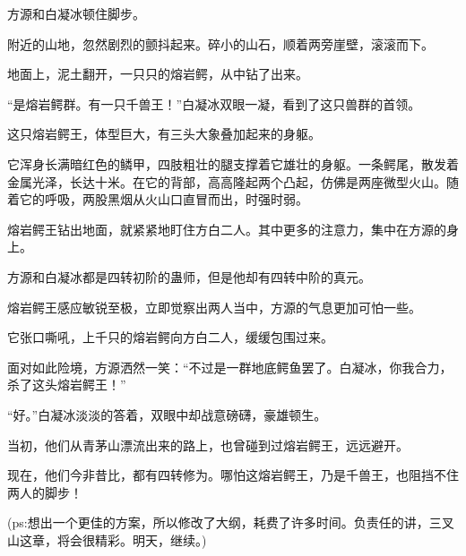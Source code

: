 \begin{this_body}
方源和白凝冰顿住脚步。

附近的山地，忽然剧烈的颤抖起来。碎小的山石，顺着两旁崖壁，滚滚而下。

地面上，泥土翻开，一只只的熔岩鳄，从中钻了出来。

“是熔岩鳄群。有一只千兽王！”白凝冰双眼一凝，看到了这只兽群的首领。

这只熔岩鳄王，体型巨大，有三头大象叠加起来的身躯。

它浑身长满暗红色的鳞甲，四肢粗壮的腿支撑着它雄壮的身躯。一条鳄尾，散发着金属光泽，长达十米。在它的背部，高高隆起两个凸起，仿佛是两座微型火山。随着它的呼吸，两股黑烟从火山口直冒而出，时强时弱。

熔岩鳄王钻出地面，就紧紧地盯住方白二人。其中更多的注意力，集中在方源的身上。

方源和白凝冰都是四转初阶的蛊师，但是他却有四转中阶的真元。

熔岩鳄王感应敏锐至极，立即觉察出两人当中，方源的气息更加可怕一些。

它张口嘶吼，上千只的熔岩鳄向方白二人，缓缓包围过来。

面对如此险境，方源洒然一笑：“不过是一群地底鳄鱼罢了。白凝冰，你我合力，杀了这头熔岩鳄王！”

“好。”白凝冰淡淡的答着，双眼中却战意磅礴，豪雄顿生。

当初，他们从青茅山漂流出来的路上，也曾碰到过熔岩鳄王，远远避开。

现在，他们今非昔比，都有四转修为。哪怕这熔岩鳄王，乃是千兽王，也阻挡不住两人的脚步！

(ps:想出一个更佳的方案，所以修改了大纲，耗费了许多时间。负责任的讲，三叉山这章，将会很精彩。明天，继续。)

\end{this_body}


